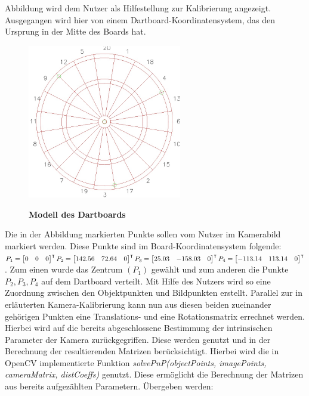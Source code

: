 Abbildung  wird dem Nutzer als Hilfestellung zur Kalibrierung angezeigt. Ausgegangen wird hier von einem Dartboard-Koordinatensystem, das den Ursprung in der Mitte des Boards hat.  
\begin{figure}
\centering
\includegraphics[width=0.6\textwidth]{media/confighints.jpg}\\
\caption{\textbf{Modell des Dartboards}}
\label{Fig:dartmodel}
\end{figure}
Die in der Abbildung markierten Punkte sollen vom Nutzer im Kamerabild markiert werden. 
Diese Punkte sind im Board-Koordinatensystem folgende:
$P_1 = \begin{bmatrix}0& 0& 0 \\\end{bmatrix}^\intercal 
P_2 = \begin{bmatrix}142.56& 72.64& 0 \\\end{bmatrix}^\intercal\\
P_3 = \begin{bmatrix}25.03& -158.03& 0 \\\end{bmatrix}^\intercal
P_4 = \begin{bmatrix}-113.14& 113.14& 0 \\\end{bmatrix}^\intercal$.
Zum einen wurde das Zentrum $(P_1)$ gewählt und zum anderen die Punkte $P_2,P_3,P_4$ auf dem Dartboard verteilt. Mit Hilfe des Nutzers wird so eine Zuordnung zwischen den Objektpunkten und Bildpunkten erstellt. Parallel zur in  erläuterten Kamera-Kalibrierung kann nun aus diesen beiden zueinander gehörigen Punkten eine Translations- und eine Rotationsmatrix errechnet werden. Hierbei wird auf die bereits abgeschlossene Bestimmung der intrinsischen Parameter der Kamera zurückgegriffen. Diese werden genutzt und in der Berechnung der resultierenden Matrizen berücksichtigt. Hierbei wird die in OpenCV implementierte Funktion \textit{solvePnP(objectPoints, imagePoints, cameraMatrix, distCoeffs)} genutzt. Diese ermöglicht die Berechnung der Matrizen aus bereits aufgezählten Parametern. Übergeben werden:
